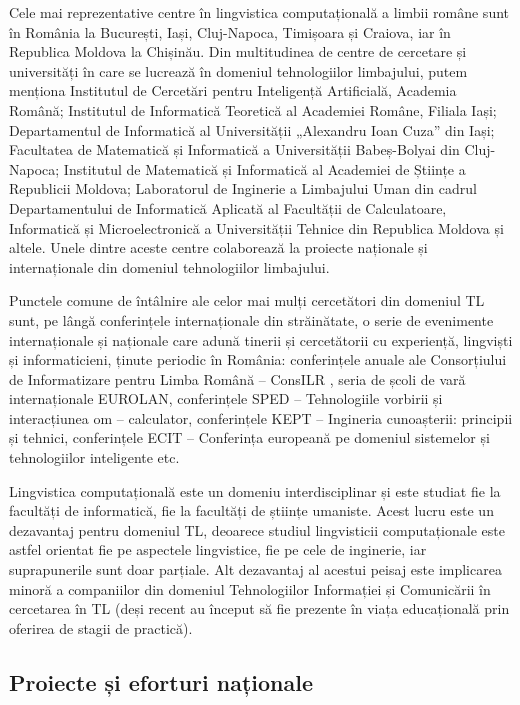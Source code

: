 \begin{multicols}{2}
Cele mai reprezentative centre în lingvistica computațională a limbii române sunt în România la București, Iași, Cluj-Napoca, Timișoara și Craiova, iar în Republica Moldova la Chișinău. Din multitudinea de centre de cercetare și universități în care se lucrează în domeniul tehnologiilor limbajului, putem menționa Institutul de Cercetări pentru Inteligență Artificială, Academia Română; Institutul de Informatică Teoretică al Academiei Române, Filiala Iași; Departamentul de Informatică al Universității „Alexandru Ioan Cuza” din Iași; Facultatea de Matematică și Informatică a Universității Babeș-Bolyai din Cluj-Napoca; Institutul de Matematică și Informatică al Academiei de Științe a Republicii Moldova; Laboratorul de Inginerie a Limbajului Uman din cadrul Departamentului de Informatică Aplicată al Facultății de Calculatoare, Informatică și Microelectronică a Universității Tehnice din Republica Moldova și altele. Unele dintre aceste centre colaborează la proiecte naționale și internaționale din domeniul tehnologiilor limbajului. 

Punctele comune de întâlnire ale celor mai mulți cercetători din domeniul TL sunt, pe lângă conferințele internaționale din străinătate, o serie de evenimente internaționale și naționale care adună tinerii și cercetătorii cu experiență, lingviști și informaticieni, ținute periodic în România: conferințele anuale ale Consorțiului de Informatizare pentru Limba Română -- ConsILR \cite{consilr}, seria de școli de vară internaționale EUROLAN, conferințele SPED -- Tehnologiile vorbirii și interacțiunea om -- calculator, conferințele KEPT -- Ingineria cunoașterii: principii și tehnici, conferințele ECIT -- Conferința europeană pe domeniul sistemelor și tehnologiilor inteligente etc.

Lingvistica computațională este un domeniu interdisciplinar și este studiat fie la facultăți de informatică, fie la facultăți de științe umaniste. Acest lucru este un dezavantaj pentru domeniul TL, deoarece studiul lingvisticii computaționale este astfel orientat fie pe aspectele lingvistice, fie pe cele de inginerie, iar suprapunerile sunt doar parțiale. Alt dezavantaj al acestui peisaj este implicarea minoră a companiilor din domeniul Tehnologiilor Informației și Comunicării în cercetarea în TL (deși recent au început să fie prezente în viața educațională prin oferirea de stagii de practică).

\subsection{Proiecte și eforturi naționale}


\end{multicols}
